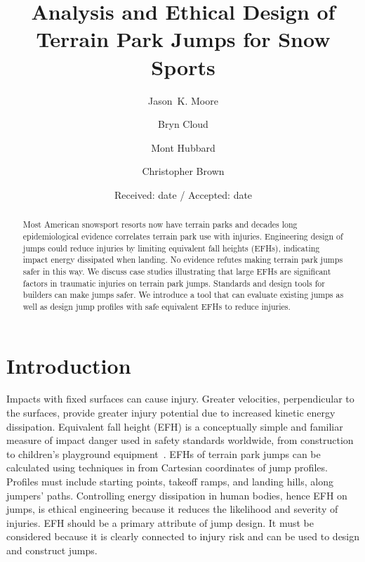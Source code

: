 \documentclass[smallextended]{svjour3}       %
\begin{document}
\title{Analysis and Ethical Design of Terrain Park Jumps for Snow Sports}

\author{
  Jason~K. Moore \and
  Bryn Cloud \and
  Mont Hubbard \and
  Christopher Brown
}


\date{Received: date / Accepted: date}

\maketitle

\begin{abstract}
  Most American snowsport resorts now have terrain parks and decades long
  epidemiological evidence correlates terrain park use with injuries.
  Engineering design of jumps could reduce injuries by limiting equivalent fall
  heights (EFHs), indicating impact energy dissipated when landing. No evidence
  refutes making terrain park jumps safer in this way. We discuss case studies
  illustrating that large EFHs are significant factors in traumatic injuries on
  terrain park jumps. Standards and design tools for builders can make jumps
  safer. We introduce a tool that can evaluate existing jumps as well as design
  jump profiles with safe equivalent EFHs to reduce injuries.
\end{abstract}

\section{Introduction}
\label{intro}
%
Impacts with fixed surfaces can cause injury. Greater velocities, perpendicular
to the surfaces, provide greater injury potential due to increased kinetic
energy dissipation. Equivalent fall height (EFH) is a conceptually simple and
familiar measure of impact danger used in safety standards worldwide, from
construction~\cite{OSHA2021} to children's playground
equipment~\cite{Chalmers1996}. EFHs of terrain park jumps can be calculated
using techniques in \cite{Hubbard2009} from Cartesian coordinates of jump
profiles. Profiles must include starting points, takeoff ramps, and landing
hills, along jumpers' paths. Controlling energy dissipation in human bodies,
hence EFH on jumps, is ethical engineering because it reduces the likelihood
and severity of injuries. EFH should be a primary attribute of jump design. It
must be considered because it is clearly connected to injury risk and can be
used to design and construct jumps.
\end{document}
